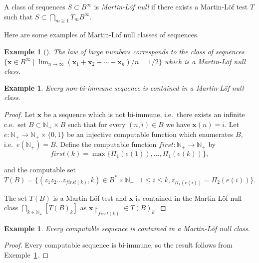 \documentclass[%
 preprint,
 showpacs,
 showkeys,
 preprintnumbers,
  amsmath,amssymb,
  aps,
 pra,
  longbibliography,
  floatfix,
 ]{revtex4-1}
\theoremstyle{plain}
\newtheorem{example}[theorem]{Example}
\newcommand{\rest}[2]{#1\!\!\restriction_{#2}}
\newcommand{\N}{\mathbb{N}}%
\newcommand{\alphabet}{\{0,1\}}
\newcommand{\B}{B^*}%
\newcommand{\BI}{B^\infty}%
\newcommand{\x}{\mathbf{x}}
\newcommand{\ar}{\rightarrow}
\begin{document}
\medskip
 A class of sequences $S \subset \BI$ is {\em Martin-L\"of null} if there exists a Martin-L\"of test $T$ such that $S \subset \bigcap_{m\ge 1} T_{m}\BI$.

 \medskip


Here are some examples of Martin-L\"of null classes of sequences.

\begin{example}[\cite{Cris2002}]\label{ex:lln}  The law of large numbers corresponds to the class of sequences $\{\x\in \BI \mid \lim_{n\ar \infty}(\x_{1}+ \x_{2}+ \cdots +\x_{n})/n=1/2\}$ which is a Martin-L\"of null class.
\end{example}




  \begin{example}\label{ex:mltestbiimunity}
Every non-bi-immune  sequence  is contained in a Martin-L\"of null class.
\end{example}

\begin{proof}
Let $\x$ be a sequence which is not bi-immune, i.e.\ there exists an infinite c.e.\ set $B \subset \N_{+} \times B$ such that
for every $(n,i)\in B$ we have $\x(n)=i$.
Let $e\colon\N_{+}\to\N_{+}\times\alphabet$ be an injective computable function which enumerates $B$, i.e.\ $e(\N_{+})=B$.
Define the computable function $first : \N_{+} \rightarrow \N_{+}$ by
$$first(k) = \max \{\Pi_1(e(1)),\dots,\Pi_1(e(k))\},$$

\noindent and the computable set
\[T(B) = \{(z_{1}z_{2}\dots z_{first(k)},k)\in \B \times \N_{+} \mid 1\le i \le k, z_{\Pi_1(e(i))}=\Pi_2(e(i))\}.\]

The set $T(B)$ is a Martin-L\"of test and
$\x $ is contained in the  Martin-L\"of null class $\bigcap_{k\in \N_{+}} [T(B)_{k}]$ as $\rest{\x}{first(k)}\in T(B)_{k}$.
\end{proof}


  \begin{example} Every computable  sequence  is contained in a Martin-L\"of null class.
  \end{example}



\begin{proof}
  Every computable sequence is bi-immune, so the result follows from Exemple~\ref{ex:mltestbiimunity}.
\end{proof}
\end{document}
